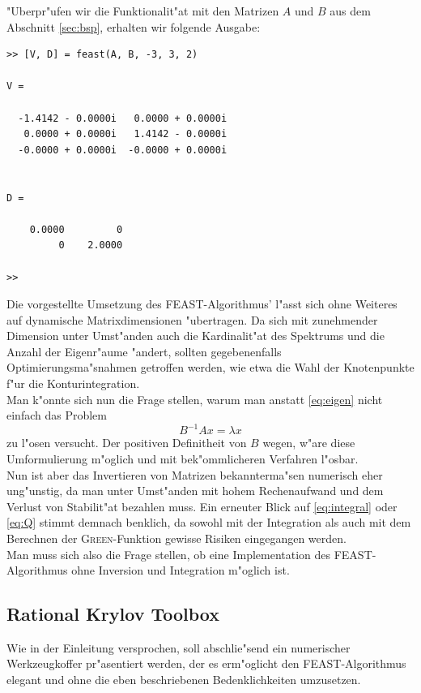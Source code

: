 "Uberpr"ufen wir die Funktionalit"at mit den Matrizen $A$ und $B$ aus dem Abschnitt
\ref{sec:bsp}, erhalten wir folgende Ausgabe:

\begin{lstlisting}[numbers=none]
>> [V, D] = feast(A, B, -3, 3, 2)

V =

  -1.4142 - 0.0000i   0.0000 + 0.0000i
   0.0000 + 0.0000i   1.4142 - 0.0000i
  -0.0000 + 0.0000i  -0.0000 + 0.0000i


D =

    0.0000         0
         0    2.0000

>>
\end{lstlisting}

\vspace{0.5cm}
Die vorgestellte Umsetzung des FEAST-Algorithmus' l"asst sich ohne Weiteres auf
dynamische Matrixdimensionen "ubertragen. Da sich mit zunehmender Dimension
unter Umst"anden auch die Kardinalit"at des Spektrums und die Anzahl der Eigenr"aume "andert, sollten
gegebenenfalls Optimierungsma"snahmen getroffen werden, wie etwa die Wahl der Knotenpunkte f"ur die
Konturintegration.\\

Man k"onnte sich nun die Frage stellen, warum man anstatt \eqref{eq:eigen} nicht
einfach das Problem
\[
B^{-1}Ax = \lambda x
\]
zu l"osen versucht. Der positiven Definitheit von $B$ wegen, w"are diese
Umformulierung m"oglich und mit bek"ommlicheren Verfahren l"osbar. \\

Nun ist aber das Invertieren von Matrizen bekannterma"sen numerisch
eher ung"unstig, da man unter Umst"anden mit hohem Rechenaufwand
und dem Verlust von Stabilit"at bezahlen muss. Ein erneuter Blick
auf \eqref{eq:integral} oder \eqref{eq:Q} stimmt demnach benklich,
da sowohl mit der Integration als auch mit dem Berechnen der \textsc{Green}-Funktion
gewisse Risiken eingegangen werden.\\

Man muss sich also die Frage stellen, ob eine Implementation des FEAST-Algorithmus
ohne Inversion und Integration m"oglich ist.


\subsection{Rational Krylov Toolbox}\label{sec:rkt}

Wie in der Einleitung versprochen, soll abschlie"send ein numerischer Werkzeugkoffer
pr"asentiert werden, der es erm"oglicht den FEAST-Algorithmus elegant und ohne
die eben beschriebenen Bedenklichkeiten umzusetzen.\\

